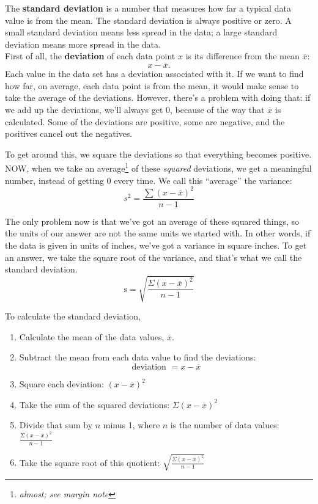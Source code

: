 The \textbf{standard deviation} is a number that measures how far a typical data value is from the mean. The standard deviation is always positive or zero. A small standard deviation means less spread in the data; a large standard deviation means more spread in the data.\\

First of all, the \textbf{deviation} of each data point $x$ is its difference from the mean $\overline{x}$:
\[x-\overline{x}.\]
Each value in the data set has a deviation associated with it.  If we want to find how far, on average, each data point is from the mean, it would make sense to take the average of the deviations.  However, there's a problem with doing that: if we add up the deviations, we'll always get 0, because of the way that $\overline{x}$ is calculated.  Some of the deviations are positive, some are negative, and the positives cancel out the negatives.

To get around this, we square the deviations so that everything becomes positive.  NOW, when we take an average\footnote{\textit{almost; see margin note}} of these \textit{squared} deviations, we get a meaningful number, instead of getting 0 every time.  We call this ``average'' the variance:
\[s^2 = \dfrac{\sum (x-\overline{x})^2}{n-1}\]

The only problem now is that we've got an average of these squared things, so the units of our answer are not the same units we started with.  In other words, if the data is given in units of inches, we've got a variance in square inches.  To get an answer, we take the square root of the variance, and that's what we call the standard deviation.
\[\textrm{s} = \sqrt{\frac{\Sigma (x - \overline{x})^2}{n-1}}\]

To calculate the standard deviation,
\begin{enumerate}
\item Calculate the mean of the data values, $\overline{x}$.
\item Subtract the mean from each data value to find the deviations: 
\[\textrm{deviation } = x - \overline{x}\]
\item Square each deviation: $(x - \overline{x})^2$
\item Take the sum of the squared deviations: $\Sigma (x - \overline{x})^2$
\item Divide that sum by $n$ minus 1, where $n$ is the number of data values: $\frac{\Sigma (x - \overline{x})^2}{n-1}$
\item Take the square root of this quotient: $\sqrt{\frac{\Sigma (x - \overline{x})^2}{n-1}}$
\end{enumerate}

